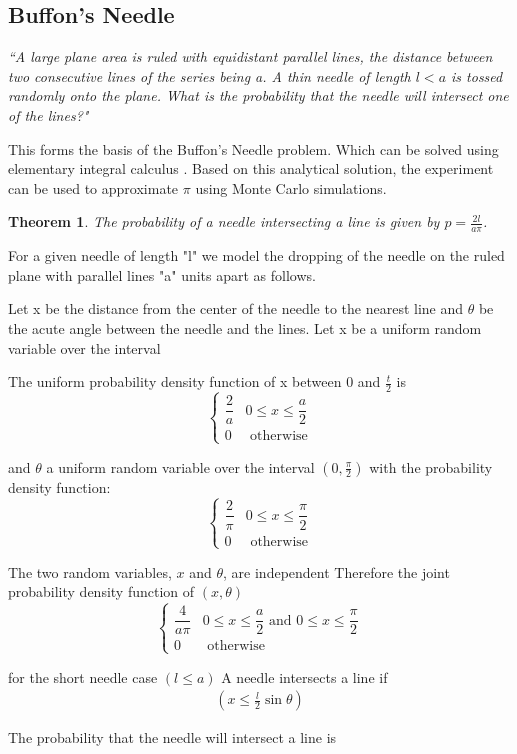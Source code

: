 \documentclass[12pt]{article}
\numberwithin{equation}{section}
\newtheorem{theorem}{Theorem}[section]
\begin{document}
\subsection{Buffon's Needle}
 \textit{“A large plane area is ruled with equidistant parallel lines, the distance between two consecutive lines
of the series being a. A thin needle of length $l< a$ is tossed randomly onto the plane. What is the probability that the needle will intersect one of the lines?"}\par
 This forms the basis of the Buffon’s Needle problem. Which can be solved using elementary integral calculus \cite{needlewang}. Based on this analytical solution, the experiment can be used to approximate $\pi$ using Monte Carlo simulations.
\begin{theorem}
The probability of a needle intersecting a line is given by $p=\frac{2l}{a \pi}$.
\end{theorem}
 For a given needle of length "l" we model the dropping of the needle on the ruled plane with parallel lines "a" units apart as follows. \par
 Let x be the distance from the center of the needle to the nearest line and $\theta$ be the acute angle between the needle and the lines. Let x be a uniform random variable over the interval
\par
The uniform probability density function of x between 0 and $ \frac{t}{2}$ is
\[
\begin{cases}
   \dfrac{2}{a} & 0 \leqslant x\leqslant \dfrac{a}{2}\\
  0 & \text {   otherwise}
\end{cases}
\]
\par
and $\theta$ a uniform random variable over the interval $\left(0, \frac{\pi}{2}\right)$ with the probability density function:\\
\[
\begin{cases}
    \dfrac{2}{\pi} & 0 \leqslant x\leqslant \dfrac{\pi}{2}\\
    0 & \text {   otherwise}
\end{cases}
\]
\par
The two random variables, $x$ and $\theta$, are independent  Therefore the joint probability density function of
$(x,\theta)$ 
\[
\begin{cases}
    \dfrac{4}{a\pi} &  0 \leqslant x\leqslant \dfrac{a}{2} \text{ and } 0 \leqslant x\leqslant \dfrac{\pi}{2}\\
0  &  \text {   otherwise}
\end{cases}\]
\par
 for the short needle case $\left( l \leqslant a \right)$  A needle
intersects a line if
\begin{align*}
    \left( x \leqslant \frac{l}{2}\sin \theta \right )
\end{align*}
\par
The probability that the needle will intersect a line is
\end{document}
